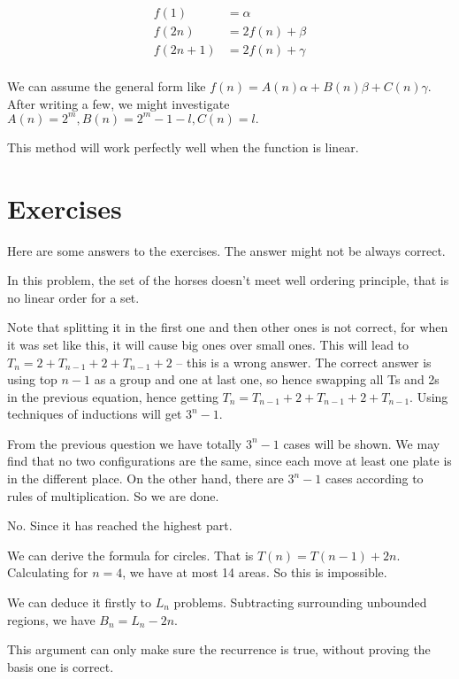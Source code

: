 \begin{align*}
    f(1) &= \alpha \\
    f(2n) &= 2f(n)+\beta \\
    f(2n+1) &= 2f(n)+\gamma \\
\end{align*}

We can assume the general form like $f(n)=A(n)\alpha+B (n) \beta+C(n) \gamma$.
After writing a few, we might investigate $A(n)=2^m, B(n)=2^m-1-l, C(n)=l.$

This method will work perfectly well when the function is linear. 

\section{Exercises}

Here are some answers to the exercises. The answer might not be always correct. 

 In this problem, the set of the horses doesn't meet well ordering
principle, that is no linear order for a set. 

Note that splitting it in the first one and then other ones is not correct,
for when it was set like this, it will cause big ones over small ones. This
will lead to $T_n=2+T_{n-1}+2+T_{n-1}+2$ -- this is a wrong answer. The correct
answer is using top $n-1$ as a group and one at last one, so hence swapping all
Ts and 2s in the previous equation, hence getting
$T_n=T_{n-1}+2+T_{n-1}+2+T_{n-1}$. Using techniques of inductions will get
$3^n-1$. 

From the previous question we have totally $3^n-1$ cases will be shown. We may
find that no two configurations are the same, since each move at least one
plate is in the different place. On the other hand, there are $3^n-1$ cases
according to rules of multiplication. So we are done. 

No. Since it has reached the highest part. 

We can derive the formula for circles. That is $T(n)=T(n-1)+2n$. Calculating
for $n=4$, we have at most 14 areas. So this is impossible.   

We can deduce it firstly to $L_n$ problems. Subtracting surrounding unbounded
regions, we have $B_n = L_n -2n$. 

This argument can only make sure the recurrence is true, without proving the
basis one is correct. 


